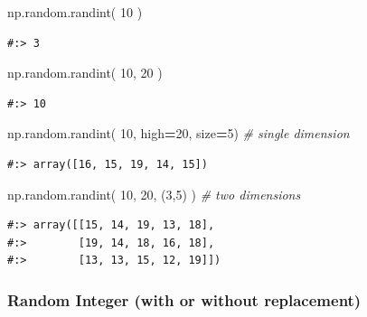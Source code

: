 \documentclass[
]{book}
\newenvironment{Shaded}{\begin{snugshade}}{\end{snugshade}}
\newcommand{\CommentTok}[1]{\textcolor[rgb]{0.37,0.37,0.37}{\textit{#1}}}
\newcommand{\DecValTok}[1]{\textcolor[rgb]{0.06,0.06,0.06}{#1}}
\newcommand{\NormalTok}[1]{#1}
\newcommand{\OperatorTok}[1]{\textcolor[rgb]{0.43,0.43,0.43}{\textbf{#1}}}
\begin{document}
\begin{Shaded}
\begin{Highlighting}[]
\NormalTok{np.random.randint( }\DecValTok{10}\NormalTok{ )}
\end{Highlighting}
\end{Shaded}

\begin{verbatim}
#:> 3
\end{verbatim}

\begin{Shaded}
\begin{Highlighting}[]
\NormalTok{np.random.randint( }\DecValTok{10}\NormalTok{, }\DecValTok{20}\NormalTok{ )}
\end{Highlighting}
\end{Shaded}

\begin{verbatim}
#:> 10
\end{verbatim}

\begin{Shaded}
\begin{Highlighting}[]
\NormalTok{np.random.randint( }\DecValTok{10}\NormalTok{, high}\OperatorTok{=}\DecValTok{20}\NormalTok{, size}\OperatorTok{=}\DecValTok{5}\NormalTok{)   }\CommentTok{# single dimension}
\end{Highlighting}
\end{Shaded}

\begin{verbatim}
#:> array([16, 15, 19, 14, 15])
\end{verbatim}

\begin{Shaded}
\begin{Highlighting}[]
\NormalTok{np.random.randint( }\DecValTok{10}\NormalTok{, }\DecValTok{20}\NormalTok{, (}\DecValTok{3}\NormalTok{,}\DecValTok{5}\NormalTok{) )        }\CommentTok{# two dimensions}
\end{Highlighting}
\end{Shaded}

\begin{verbatim}
#:> array([[15, 14, 19, 13, 18],
#:>        [19, 14, 18, 16, 18],
#:>        [13, 13, 15, 12, 19]])
\end{verbatim}

\hypertarget{random-integer-with-or-without-replacement}{%
\subsubsection{Random Integer (with or without replacement)}\label{random-integer-with-or-without-replacement}}
\end{document}
